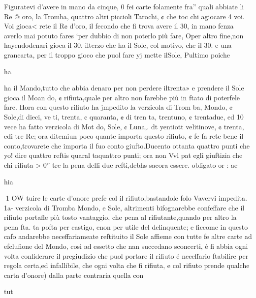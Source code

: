 \documentclass[11pt,a6paper]{article}
\begin{document}
 Figuratevi d’avere in mano
da cinque, 0 fei carte folamente fra” quali abbiate li Re @
oro, la Tromba, quattro altri piccioli Tarochi, ¢ che toc
chi agiocare 4 voi. Voi gioca<
rete il R¢ d’oro, il fecondo che
fi trova avere il 30, in mano
fenza averlo mai potuto fares
‘per dubbio di non poterlo più
fare, Oper altro fine,non hayendodenari gioca il 30. ilterzo
che ha il Sole, col motivo, che
il 30. e una grancarta, per il
troppo gioco che puol fare yj
mette ilSole, Pultimo poiche

ha

 

 

 

 
 

 

 

 

ha il Mando,tutto che abbia denaro per non perdere iltrenta»
e prendere il Sole gioca il Moan
do, ¢ rifiuta,quale per altro non
farebbe più in ftato di poterfele
fare. Hora con questo rifiuto ha
jmpedito la verzicola di Trom
ba, Mondo, ¢ Sole,di dieci, ve
ti, trenta, ¢ quaranta, ¢ di tren
ta, trentuno, ¢ trentadue, ed 10
vece ha fatto verzicola di Mot
do, Sole, ¢ Luna,. dt yentiott
velitinove, ¢ trenta, edi tre
Re; ora ditemiun poco quante
importa questo rifiuto, ¢ fe fa
rete bene il conto,trovarete che
importa il fuo conto giufto.Ducento ottanta quattro punti che
yo! dire quattro reftis quaral
taquattro punti; ora non Vvl pat
egli giuftizia che chi rifiuta > 0”
tre la pena delli due refti,debhs
sacora essere. obligato or :
ae

hia

 
1 OW
tuire le carte d’onore prefe col
il rifiuto,bastandole folo Vavervi impedita. 1a- verzicola di
Tromba Mondo, e Sole, altrimenti bifognarebbe confeffare
che il rifiuto portafle più tosto
vantaggio, che pena al rifiutante,quando per altro la pena fta.
ta pofta per castigo, enon per
utile del delinquente; e ficcome
in questo cafo andarebbe neceffariameate reftituito il Sole affieme con tutte fe altre carte ad
efclufione del Mondo, cosi ad
essetto che nan succedano sconcerti, é fi abbia ogni volta
confiderare il pregiudizio che
puol portare il rifiuto é neceffario ftabilire per regola certa,ed infallibile, che ogni volta
che fi rifiuta, e col rifiuto
prende qualche carta d’onore)
dalla parte contraria quella con

tut
 

 

 
 
\end{document}
